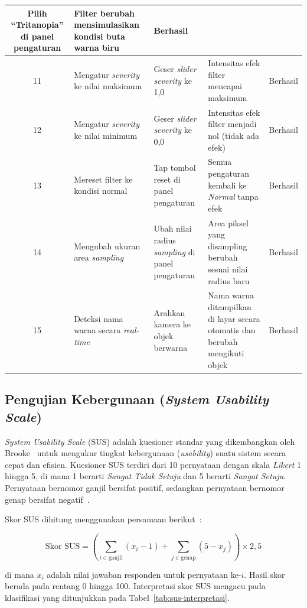 \begin{longtable}{|c|>{\raggedright\arraybackslash}p{3.5cm}|>{\raggedright\arraybackslash}p{2.8cm}|>{\raggedright\arraybackslash}p{3.5cm}|c|}
  Pilih ``Tritanopia'' di panel pengaturan &
  Filter berubah mensimulasikan kondisi buta warna biru &
  Berhasil \\
  \hline
  11 &
  Mengatur \textit{severity} ke nilai maksimum &
  Geser \textit{slider severity} ke 1,0 &
  Intensitas efek filter mencapai maksimum &
  Berhasil \\
  \hline
  12 &
  Mengatur \textit{severity} ke nilai minimum &
  Geser \textit{slider severity} ke 0,0 &
  Intensitas efek filter menjadi nol (tidak ada efek) &
  Berhasil \\
  \hline
  13 &
  Mereset filter ke kondisi normal &
  Tap tombol reset di panel pengaturan &
  Semua pengaturan kembali ke \textit{Normal} tanpa efek &
  Berhasil \\
  \hline
  14 &
  Mengubah ukuran area \textit{sampling} &
  Ubah nilai radius \textit{sampling} di panel pengaturan &
  Area piksel yang disampling berubah sesuai nilai radius baru &
  Berhasil \\
  \hline
  15 &
  Deteksi nama warna secara \textit{real-time} &
  Arahkan kamera ke objek berwarna &
  Nama warna ditampilkan di layar secara otomatis dan berubah mengikuti objek &
  Berhasil \\
  \hline
\end{longtable}

\subsection{Pengujian Kebergunaan (\textit{System Usability Scale})}

\textit{System Usability Scale} (SUS) adalah kuesioner standar yang dikembangkan oleh Brooke~\parencite{sus_original} untuk mengukur tingkat kebergunaan (\textit{usability}) suatu sistem secara cepat dan efisien.
Kuesioner SUS terdiri dari 10 pernyataan dengan skala \textit{Likert} 1 hingga 5, di mana 1 berarti \textit{Sangat Tidak Setuju} dan 5 berarti \textit{Sangat Setuju}.
Pernyataan bernomor ganjil bersifat positif, sedangkan pernyataan bernomor genap bersifat negatif~\parencite{sus}.

Skor SUS dihitung menggunakan persamaan berikut~\parencite{sus_original}:

\begin{equation}
  \text{Skor SUS} = \left(\sum_{i \in \text{ganjil}}(x_i - 1) + \sum_{j \in \text{genap}}(5 - x_j)\right) \times 2{,}5
  \label{eq:sus}
\end{equation}

\noindent di mana $x_i$ adalah nilai jawaban responden untuk pernyataan ke-$i$.
Hasil skor berada pada rentang 0 hingga 100.
Interpretasi skor SUS mengacu pada klasifikasi yang ditunjukkan pada Tabel~\ref{tab:sus-interpretasi}.

